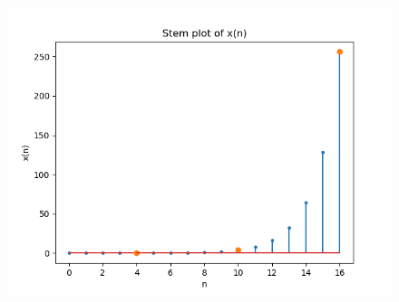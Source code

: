 \documentclass[journal,12pt,twocolumn]{IEEEtran}
\theoremstyle{remark}
\begin{document}
\begin{enumerate}
\begin{figure}[h]
    \includegraphics[width=\columnwidth]{A_1.png}
        \label{fig:1}
\end{figure}


\end{enumerate}
\end{document}
